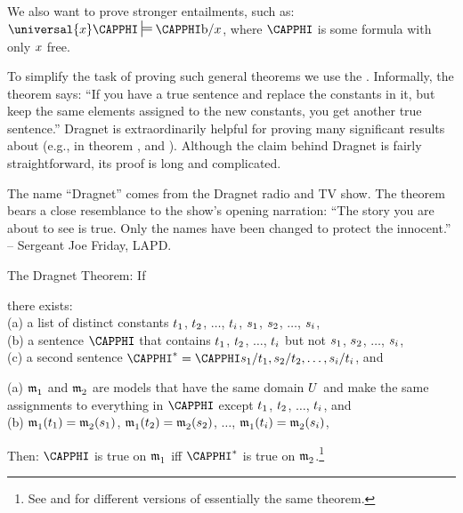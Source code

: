 We also want to prove stronger entailments, such as: $\universal{\variable{x}}\CAPPHI\sdtstile{}{}\CAPPHI\constant{b}/\variable{x}$, where $\CAPPHI$ is some \GQL{} formula with only $x$ free.

To simplify the task of proving such general theorems we use the .
Informally, the theorem says: ``If you have a true sentence and replace the constants in it, but keep the same elements assigned to the new constants, you get another true sentence.''
Dragnet is extraordinarily helpful for proving many significant results about \GQL{} (e.g., in theorem , and ).
Although the claim behind Dragnet is fairly straightforward, its proof is long and complicated.
\\
\begin{commentary}
	The name ``Dragnet'' comes from the Dragnet radio and TV show.
    The theorem bears a close resemblance to the show's opening narration:
	``The story you are about to see is true. Only the names have been changed to protect the innocent.'' -- Sergeant Joe Friday, LAPD.
\end{commentary}

\begin{THEOREM}{ The Dragnet Theorem:} If
\begin{cenumerate}
\item there exists: \\(a) a list of distinct constants $t_1$, $t_2$, $\ldots$, $t_{i}$, $s_1$, $s_2$, $\ldots$, $s_{i}$, \\(b) a \GQL{} sentence $\CAPPHI$ that contains $t_1$, $t_2$, $\ldots$, $t_{i}$ but not $s_1$, $s_2$, $\ldots$, $s_{i}$, \\(c) a second sentence $\CAPPHI^*=\CAPPHI\variable{s}_1/\variable{t}_1,\variable{s}_2/\variable{t}_2,\ldots,\variable{s}_{\integer{i}}/\variable{t}_{\integer{i}}$, and
\item (a) $\mathfrak{m^{\mathrm{}}_{\mathrm{1}}}$ and $\mathfrak{m^{\mathrm{}}_{\mathrm{2}}}$ are \GQL{} models that have the same domain $U$ and make the same assignments to everything in $\CAPPHI$ except $t_1$, $t_2$, $\ldots$, $t_{i}$, and \\(b) $\mathfrak{m^{\mathrm{}}_{\mathrm{1}}}(t_1)=\mathfrak{m^{\mathrm{}}_{\mathrm{2}}}(s_1)$, $\mathfrak{m^{\mathrm{}}_{\mathrm{1}}}(t_2)=\mathfrak{m^{\mathrm{}}_{\mathrm{2}}}(s_2)$, $\ldots$, $\mathfrak{m^{\mathrm{}}_{\mathrm{1}}}(t_{i})=\mathfrak{m^{\mathrm{}}_{\mathrm{2}}}(s_{i})$,
\end{cenumerate} 
Then: $\CAPPHI$ is true on $\mathfrak{m^{\mathrm{}}_{\mathrm{1}}}$ iff $\CAPPHI^*$ is true on $\mathfrak{m^{\mathrm{}}_{\mathrm{2}}}$.\footnote{
	See \citealt[66]{Mates1972} and \citealt[577]{Bergmann2003} for different versions of essentially the same theorem.
}

\end{THEOREM}

